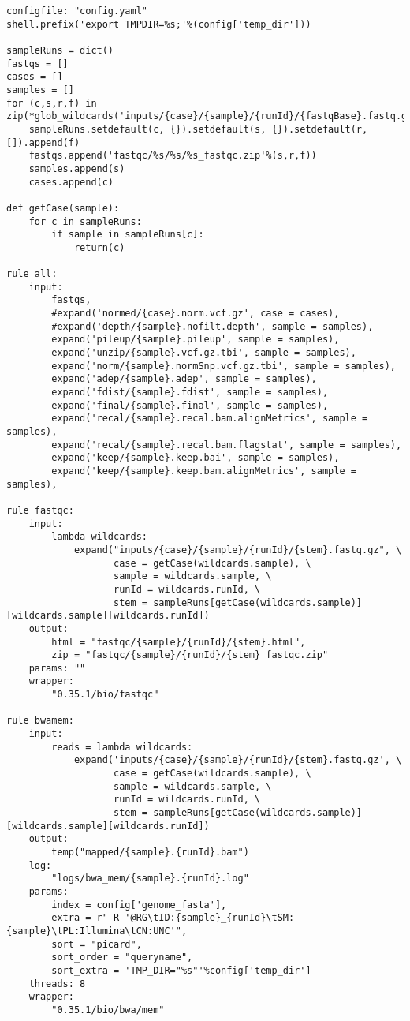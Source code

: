 \documentclass{article}\usepackage[]{graphicx}\usepackage[]{color}
\makeatletter
\newenvironment{kframe}{%
 \def\at@end@of@kframe{}%
 \ifinner\ifhmode%
  \def\at@end@of@kframe{\end{minipage}}%
  \begin{minipage}{\columnwidth}%
 \fi\fi%
 \def\FrameCommand##1{\hskip\@totalleftmargin \hskip-\fboxsep
 \colorbox{shadecolor}{##1}\hskip-\fboxsep
     \hskip-\linewidth \hskip-\@totalleftmargin \hskip\columnwidth}%
 \MakeFramed {\advance\hsize-\width
   \@totalleftmargin\z@ \linewidth\hsize
   \@setminipage}}%
 {\par\unskip\endMakeFramed%
 \at@end@of@kframe}
\newenvironment{knitrout}{}{} %
\makeatother
\begin{document}
\begin{knitrout}
\color{fgcolor}\begin{kframe}
\begin{verbatim}
configfile: "config.yaml"
shell.prefix('export TMPDIR=%s;'%(config['temp_dir']))

sampleRuns = dict()
fastqs = []
cases = []
samples = []
for (c,s,r,f) in zip(*glob_wildcards('inputs/{case}/{sample}/{runId}/{fastqBase}.fastq.gz')):
    sampleRuns.setdefault(c, {}).setdefault(s, {}).setdefault(r, []).append(f)
    fastqs.append('fastqc/%s/%s/%s_fastqc.zip'%(s,r,f))
    samples.append(s)
    cases.append(c)
    
def getCase(sample):
    for c in sampleRuns:
        if sample in sampleRuns[c]:
            return(c)

rule all:
    input:
        fastqs,
        #expand('normed/{case}.norm.vcf.gz', case = cases),
        #expand('depth/{sample}.nofilt.depth', sample = samples),
        expand('pileup/{sample}.pileup', sample = samples),
        expand('unzip/{sample}.vcf.gz.tbi', sample = samples),
        expand('norm/{sample}.normSnp.vcf.gz.tbi', sample = samples),
        expand('adep/{sample}.adep', sample = samples),
        expand('fdist/{sample}.fdist', sample = samples),
        expand('final/{sample}.final', sample = samples),
        expand('recal/{sample}.recal.bam.alignMetrics', sample = samples),
        expand('recal/{sample}.recal.bam.flagstat', sample = samples),
        expand('keep/{sample}.keep.bai', sample = samples),
        expand('keep/{sample}.keep.bam.alignMetrics', sample = samples),

rule fastqc:
    input:
        lambda wildcards: 
            expand("inputs/{case}/{sample}/{runId}/{stem}.fastq.gz", \
                   case = getCase(wildcards.sample), \
                   sample = wildcards.sample, \
                   runId = wildcards.runId, \
                   stem = sampleRuns[getCase(wildcards.sample)][wildcards.sample][wildcards.runId])
    output:
        html = "fastqc/{sample}/{runId}/{stem}.html",
        zip = "fastqc/{sample}/{runId}/{stem}_fastqc.zip"
    params: ""
    wrapper:
        "0.35.1/bio/fastqc"

rule bwamem:
    input:
        reads = lambda wildcards: 
            expand('inputs/{case}/{sample}/{runId}/{stem}.fastq.gz', \
                   case = getCase(wildcards.sample), \
                   sample = wildcards.sample, \
                   runId = wildcards.runId, \
                   stem = sampleRuns[getCase(wildcards.sample)][wildcards.sample][wildcards.runId])
    output:
        temp("mapped/{sample}.{runId}.bam")
    log:
        "logs/bwa_mem/{sample}.{runId}.log"
    params:
        index = config['genome_fasta'],
        extra = r"-R '@RG\tID:{sample}_{runId}\tSM:{sample}\tPL:Illumina\tCN:UNC'",
        sort = "picard",
        sort_order = "queryname",
        sort_extra = 'TMP_DIR="%s"'%config['temp_dir']
    threads: 8
    wrapper:
        "0.35.1/bio/bwa/mem"


\end{verbatim}
\end{kframe}
\end{knitrout}
\end{document}
